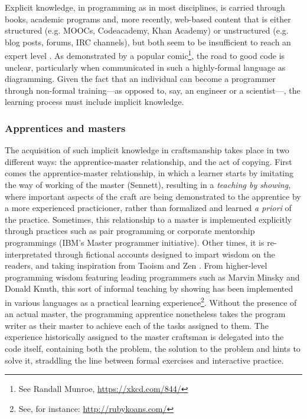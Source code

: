 Explicit knowledge, in programming as in most disciplines, is carried through books, academic programs and, more recently, web-based content that is either structured (e.g. MOOCs, Codeacademy, Khan Academy) or unstructured (e.g. blog posts, forums, IRC channels), but both seem to be insufficient to reach an expert level \citep{davies_models_1993}. As demonstrated by a popular comic\footnote{See Randall Munroe, \url{https://xkcd.com/844/}}, the road to good code is unclear, particularly when communicated in such a highly-formal language as diagramming. Given the fact that an individual can become a programmer through non-formal training---as opposed to, say, an engineer or a scientist---, the learning process must include implicit knowledge.

\subsubsection{Apprentices and masters}
\label{subsubsec:apprentices-masters}

The acquisition of such implicit knowledge in craftsmanship takes place in two different ways: the apprentice-master relationship, and the act of copying. First comes the apprentice-master relationship, in which a learner starts by  imitating the way of working of the master (Sennett), resulting in a \emph{teaching by showing}, where important aspects of the craft are being demonstrated to the apprentice by a more experienced practicioner, rather than formalized and learned \emph{a priori} of the practice. Sometimes, this relationship to a master is implemented explicitly through practices such as pair programming \citep{williams_pair_2003} or corporate mentorship programmings (IBM's Master programmer initiative). Other times, it is re-interpretated through fictional accounts designed to impart wisdom on the readers, and taking inspiration from Taoism and Zen \citep{james_tao_1987,raymond_new_1996}. From higher-level programming wisdom featuring leading programmers such as Marvin Minsky and Donald Knuth, this sort of informal teaching by showing has been implemented in various languages as a practical learning experience\footnote{See, for instance: \url{http://rubykoans.com/}}. Without the presence of an actual master, the programming apprentice nonetheless takes the program writer as their master to achieve each of the tasks assigned to them. The experience historically assigned to the master craftsman is delegated into the code itself, containing both the problem, the solution to the problem and hints to solve it, straddling the line between formal exercises and interactive practice.

